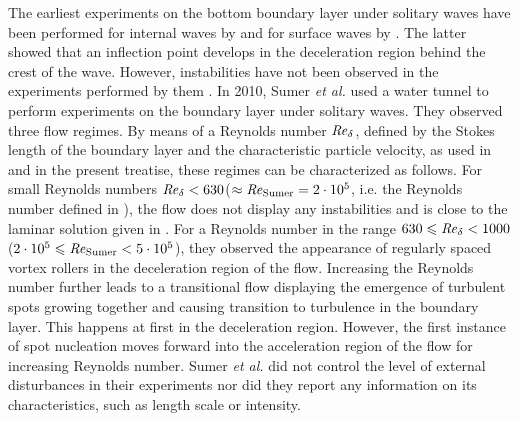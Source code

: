 \documentclass{jfm}
\let\le=\leqslant  \let\leq=\leqslant
\newcommand\Rey{\mbox{\textit{Re}}}  %
\newcommand\sumer{{\rm Sumer}}
\begin{document}
The earliest experiments on the bottom boundary layer under
solitary waves have been performed
for internal waves by \citep{CarrDavies2006,CarrDavies2010}
and for surface waves by \citet{LiuParkCowen2007}.
The latter showed that an inflection
point develops in the deceleration region behind the crest
of the wave. However, instabilities have not been observed
in the experiments performed by them \citep{LiuParkCowen2007}. 
In 2010, Sumer {\em et al.} used a water tunnel 
to perform experiments on the boundary layer under solitary waves. 
They observed three flow regimes.
By means of a Reynolds number $ \Rey_{\delta} $, defined by
the Stokes length of the boundary layer and
the characteristic particle velocity, as used in \citet{OzdemirHsuBalachandar2013}
and in the present treatise,
these regimes can be characterized as follows. 
For small Reynolds numbers $ \Rey_{\delta} < 630 $($\approx \Rey_\sumer = 2 \cdot 10^5 $, i.e. the Reynolds number defined in
\citet{SumerJensenSorensenFredsoeLiuCarstensen2010}), the
flow does not display any instabilities and is close
to the laminar solution given in \cite{LiuParkCowen2007}. 
For a Reynolds number in the range $ 630  \le \Rey_\delta < 1000 $
($ 2\cdot 10^5 \le \Rey_\sumer < 5 \cdot 10^5 $),
they observed the appearance of regularly spaced vortex rollers in
the deceleration region of the flow. Increasing the Reynolds number
further leads to a transitional flow displaying the emergence of
turbulent spots growing together and causing transition to
turbulence in the boundary layer. This happens at first in the deceleration region. However, the first instance of
spot nucleation moves forward into the acceleration region of the flow
for
increasing Reynolds number. Sumer {\em et al.} did not
control the level of
external disturbances in their experiments
nor did they report
any information on its characteristics, such as length
scale or intensity. \\
\end{document}
